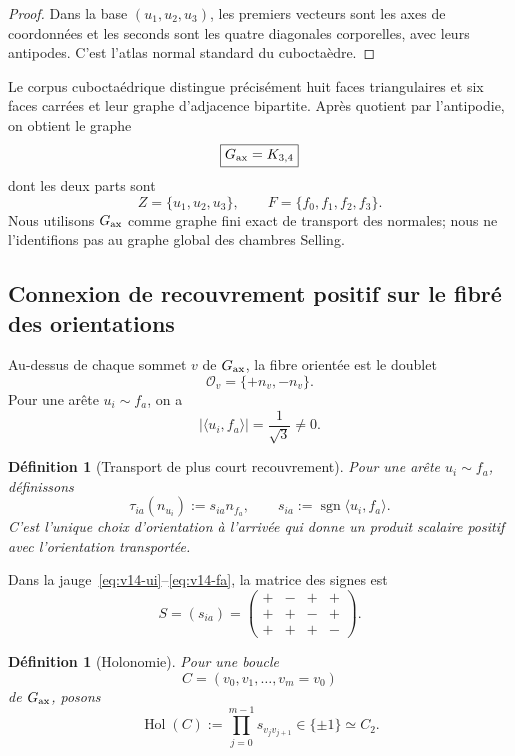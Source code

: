 \documentclass[11pt,a4paper]{article}
\newtheorem{definition}[theorem]{Définition}
\begin{document}
\begin{proof}
Dans la base $(u_1,u_2,u_3)$, les premiers vecteurs sont les axes de coordonnées et les seconds sont les quatre diagonales corporelles, avec leurs antipodes. C'est l'atlas normal standard du cuboctaèdre.
\end{proof}

Le corpus cuboctaédrique distingue précisément huit faces triangulaires et six faces carrées et leur graphe d'adjacence bipartite. Après quotient par l'antipodie, on obtient le graphe
\begin{equation}\label{eq:v14-Gaxis}
 \boxed{
 G_{\rm ax}=K_{3,4}}
\end{equation}
dont les deux parts sont
\[
 Z=\{u_1,u_2,u_3\},
 \qquad
 F=\{f_0,f_1,f_2,f_3\}.
\]
Nous utilisons $G_{\rm ax}$ comme graphe fini exact de transport des normales; nous ne l'identifions pas au graphe global des chambres Selling.

\subsection{Connexion de recouvrement positif sur le fibré des orientations}

Au-dessus de chaque sommet $v$ de $G_{\rm ax}$, la fibre orientée est le doublet
\[
 \mathcal O_v=\{+n_v,-n_v\}.
\]
Pour une arête $u_i\sim f_a$, on a
\[
 |\langle u_i,f_a\rangle|=\frac1{\sqrt3}\ne0.
\]

\begin{definition}[Transport de plus court recouvrement]\label{def:v14-overlap-connection}
Pour une arête $u_i\sim f_a$, définissons
\[
 \tau_{ia}(n_{u_i})
 :=
 s_{ia}n_{f_a},
 \qquad
 s_{ia}:=\operatorname{sgn}\langle u_i,f_a\rangle.
\]
C'est l'unique choix d'orientation à l'arrivée qui donne un produit scalaire positif avec l'orientation transportée.
\end{definition}

Dans la jauge~\eqref{eq:v14-ui}--\eqref{eq:v14-fa}, la matrice des signes est
\begin{equation}\label{eq:v14-sign-matrix}
 \boxed{
 S=(s_{ia})=
 \begin{pmatrix}
 +&-&+&+\\
 +&+&-&+\\
 +&+&+&-
 \end{pmatrix}.}
\end{equation}

\begin{definition}[Holonomie]\label{def:v14-holonomy}
Pour une boucle
\[
 C=(v_0,v_1,\ldots,v_m=v_0)
\]
de $G_{\rm ax}$, posons
\[
 \operatorname{Hol}(C)
 :=
 \prod_{j=0}^{m-1}s_{v_jv_{j+1}}\in\{\pm1\}\simeq C_2.
\]
\end{definition}
\end{document}
